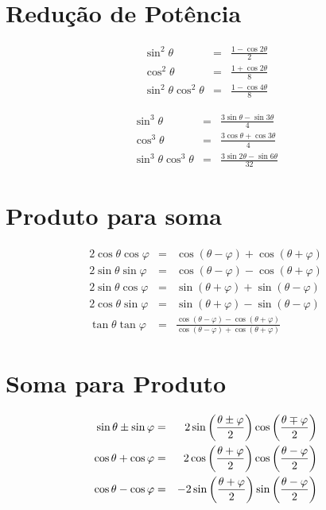 \documentclass[
	article,			%
	12pt,				%
	twoside,			%
	a4paper,			%
	english,			%
	brazil,				%
	sumario=tradicional
	]{abntex2-modelo-notas-de-aula}
\begin{document}
\begin{apendicesenv}
\section{Redução de Potência}

\begin{eqnarray}
\sin^2\theta &=& \frac{1 - \cos 2\theta}{2}\\
\cos^2\theta &=& \frac{1 + \cos 2\theta}{8}\\
\sin^2\theta \cos^2\theta &=& \frac{1 - \cos 4\theta}{8}
\end{eqnarray}


\begin{eqnarray}
\sin^3\theta &=& \frac{3 \sin\theta - \sin 3\theta}{4}\\
\cos^3\theta &=& \frac{3 \cos\theta + \cos 3\theta}{4}\\
\sin^3\theta \cos^3\theta &=& \frac{3\sin 2\theta - \sin 6\theta}{32}
\end{eqnarray}



\section{Produto para soma}
\begin{eqnarray}
2\cos \theta \cos \varphi &=& {{\cos(\theta - \varphi) + \cos(\theta + \varphi)}}\\
2\sin \theta \sin \varphi &=& {{\cos(\theta - \varphi) - \cos(\theta + \varphi)} }\\
2\sin \theta \cos \varphi &=& {{\sin(\theta + \varphi) + \sin(\theta - \varphi)} }\\
2\cos \theta \sin \varphi &=& {{\sin(\theta + \varphi) - \sin(\theta - \varphi)} }\\
\tan \theta \tan \varphi &=&\frac{\cos(\theta-\varphi)-\cos(\theta+\varphi)}{\cos(\theta-\varphi)+\cos(\theta+\varphi)}
\end{eqnarray}


\section{Soma para Produto}
\begin{eqnarray}
\sin \theta \pm \sin \varphi &=& 2 \sin\left( \frac{\theta \pm \varphi}{2} \right) \cos\left( \frac{\theta \mp \varphi}{2} \right)\\
\cos \theta + \cos \varphi &=& 2 \cos\left( \frac{\theta + \varphi} {2} \right) \cos\left( \frac{\theta - \varphi}{2} \right)\\
\cos \theta - \cos \varphi &=& -2\sin\left( {\theta + \varphi \over 2}\right) \sin\left({\theta - \varphi \over 2}\right)\\
\end{eqnarray}



\end{apendicesenv}
\end{document}
